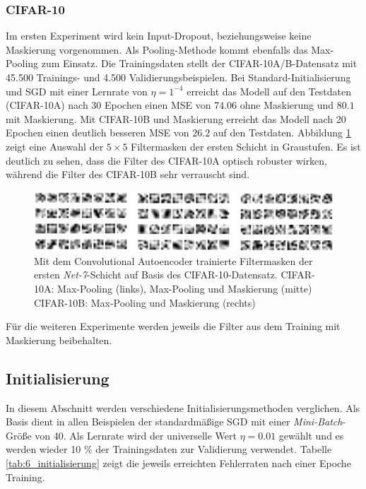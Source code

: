 \subsubsection{CIFAR-10}
Im ersten Experiment wird kein Input-Dropout, beziehungsweise keine Maskierung vorgenommen. Als Pooling-Methode kommt ebenfalls das Max-Pooling zum Einsatz. Die Trainingsdaten stellt der CIFAR-10A/B-Datensatz mit 45.500 Trainings- und 4.500 Validierungsbeispielen.
Bei Standard-Initia\-lisierung und SGD mit einer Lernrate von $\eta = 1^{-4}$ erreicht das Modell auf den Testdaten (CIFAR-10A) nach 30 Epochen einen MSE von $74.06$ ohne Maskierung und $80.1$ mit Maskierung. Mit CIFAR-10B und Maskierung erreicht das Modell nach 20 Epochen einen deutlich besseren MSE von $26.2$ auf den Testdaten. 
Abbildung \ref{fig:6_cifar_autoencoder_combined_2} zeigt eine Auswahl der $5 \times 5$ Filtermasken der ersten Schicht in Graustufen. Es ist deutlich zu sehen, dass die Filter des CIFAR-10A optisch robuster wirken, während die Filter des CIFAR-10B sehr verrauscht sind.

\begin{figure}[H]
\centering
\includegraphics[width=1.0\linewidth]{images/6_cifar_autoencoder_combined_2}
\caption[]{Mit dem Convolutional Autoencoder trainierte Filtermasken der ersten \textit{Net-7}-Schicht auf Basis des CIFAR-10-Datensatz. CIFAR-10A: Max-Pooling (links), Max-Pooling und Maskierung (mitte) CIFAR-10B: Max-Pooling und Maskierung (rechts)}
\label{fig:6_cifar_autoencoder_combined_2}
\end{figure}

Für die weiteren Experimente werden jeweils die Filter aus dem Training mit Maskierung beibehalten.

\subsection{Initialisierung}
\label{ch:6_init}
In diesem Abschnitt werden verschiedene Initialisierungsmethoden verglichen. Als Basis dient in allen Beispielen der standardmäßige SGD mit einer \textit{Mini-Batch}-Größe von 40. Als Lernrate wird der universelle Wert $\eta = 0.01$ gewählt und es werden wieder 10 \% der Trainingsdaten zur Validierung verwendet. Tabelle \ref{tab:6_initialisierung} zeigt die jeweils erreichten Fehlerraten nach einer Epoche Training.

